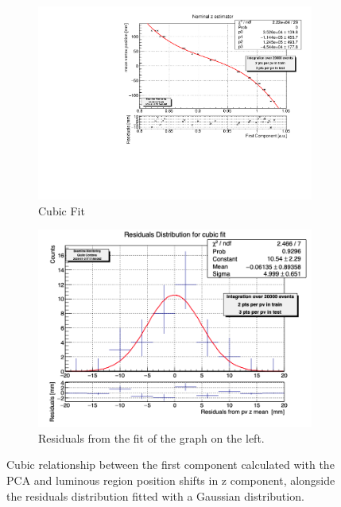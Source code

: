 \begin{figure}
    \centering
    \begin{subfigure}{0.48\textwidth}
    \includegraphics[width=\linewidth]{figures/z_cubic_fit.pdf}
    \caption{Cubic Fit}\label{fig:zfit_cubic_MC}
    \end{subfigure}
    \begin{subfigure}{0.48\textwidth}
    \includegraphics[width=\linewidth]{figures/z_cubic_res.png}
    \caption{Residuals from the fit of the graph on the left. }\label{fig:zres_cubic_MC}
    \end{subfigure}
    \caption{Cubic relationship between the first component calculated with the PCA and luminous region position shifts in z component, alongside the residuals distribution fitted with a Gaussian distribution.}
    \label{fig:z_cubic_MC}
\end{figure}

